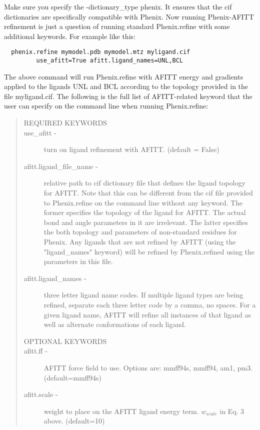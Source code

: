 \documentclass[11pt,letterpaper]{article}
\begin{document}
Make sure you specify the  -dictionary\_type phenix. It ensures that the cif dictionaries are specifically compatible with Phenix. Now running Phenix-AFITT refinement is just a question of running standard Phenix.refine with some additional keywords. For example like this:

\begin{lstlisting}
  phenix.refine mymodel.pdb mymodel.mtz myligand.cif 
         use_afitt=True afitt.ligand_names=UNL,BCL
\end{lstlisting}

The above command will run Phenix.refine with AFITT energy and gradients applied to the ligands UNL and BCL according to the topology provided in the file myligand.cif. The following is the full list of AFITT-related keyword that the user can specify on the command line when running Phenix.refine:
\begin{quote}
\begin{description}
\item[ REQUIRED KEYWORDS ]
\item[ use\_afitt -] turn on ligand refinement with AFITT. (default = False)
 \item[ afitt.ligand\_file\_name - ] relative path to cif dictionary file that defines the ligand topology for AFITT. Note that this can be different from the cif file provided to Phenix.refine on the command line without any keyword. The former specifies the topology of the ligand for AFITT. The actual bond and angle parameters in it are irrelevant. The latter specifies the both topology and parameters of non-standard residues for Phenix. Any ligands that are not refined by AFITT (using the "ligand\_names" keyword) will be refined by Phenix.refined using the parameters in this file.
\item[afitt.ligand\_names -] three letter ligand name codes. If multiple ligand types are being refined, separate each three letter code by a comma, no spaces. For a given ligand name, AFITT will refine all instances of that ligand as well as alternate conformations of each ligand.
\item[OPTIONAL KEYWORDS]
\item[afitt.ff -] AFITT force field to use. Options are: mmff94s, mmff94, am1, pm3. (default=mmff94s)
\item[afitt.scale -] weight to place on the AFITT ligand energy term. \begin{math}w_{scale}\end{math} in Eq. 3 above.   (default=10)
 \end{description}
 \end{quote}
 
\end{document}
